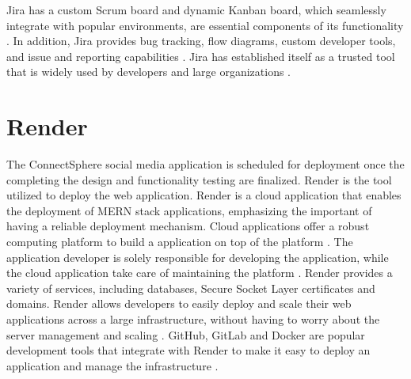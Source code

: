 Jira has a custom Scrum board and dynamic Kanban board, which seamlessly integrate with popular environments, are essential components of its functionality \cite{ozkan2019agile}. In addition, Jira provides bug tracking, flow diagrams, custom developer tools, and issue and reporting capabilities \cite{ozkan2019agile}. Jira has established itself as a trusted tool that is widely used by developers and large organizations \cite{ozkan2019agile}.  

\section{Render}
The ConnectSphere social media application is scheduled for deployment once the completing the design and functionality testing are finalized. Render is the tool utilized to deploy the web application. Render is a cloud application that enables the deployment of MERN stack applications, emphasizing the important of having a reliable deployment mechanism. Cloud applications offer a robust computing platform to build a application on top of the platform \cite{fylaktopoulos2016overview}. The application developer is solely responsible for developing the application, while the cloud application take care of maintaining the platform \cite{fylaktopoulos2016overview}. Render provides a variety of services, including databases, Secure Socket Layer certificates and domains. Render allows developers to easily deploy and scale their web applications across a large infrastructure, without having to worry about the server management and scaling \cite{ssemakula2023low}. GitHub, GitLab and Docker are popular development tools that integrate with Render to make it easy to deploy an application and manage the infrastructure \cite{ssemakula2023low}.